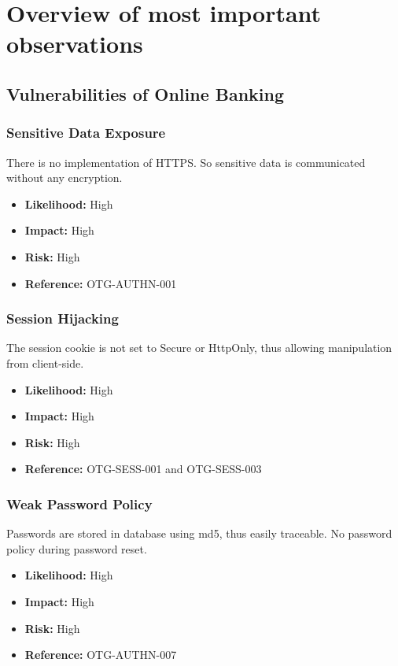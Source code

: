 \chapter{Overview of most important observations}

\section{Vulnerabilities of Online Banking}

\subsection{Sensitive Data Exposure}
There is no implementation of HTTPS. So sensitive data is communicated without any encryption.
\begin{itemize}
	\item \textbf{Likelihood:} High
	\item \textbf{Impact:} High
	\item \textbf{Risk:} High
	\item \textbf{Reference:} OTG-AUTHN-001
\end{itemize}

\subsection{Session Hijacking}
The session cookie is not set to Secure or HttpOnly, thus allowing manipulation from client-side.
\begin{itemize}
	\item \textbf{Likelihood:} High
	\item \textbf{Impact:} High
	\item \textbf{Risk:} High
	\item \textbf{Reference:} OTG-SESS-001 and OTG-SESS-003
\end{itemize}

\subsection{Weak Password Policy}
Passwords are stored in database using md5, thus easily traceable. No password policy during password reset.
\begin{itemize}
	\item \textbf{Likelihood:} High
	\item \textbf{Impact:} High
	\item \textbf{Risk:} High
	\item \textbf{Reference:} OTG-AUTHN-007
\end{itemize}

